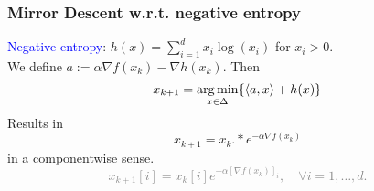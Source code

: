 \documentclass{beamer}
\begin{document}

\begin{frame}
  \frametitle{Mirror Descent w.r.t. negative entropy}
    \textcolor{blue}{Negative entropy}: $h(x) = \sum_{i=1}^{d} x_i \log(x_i)$ for $ x_i > 0$. \\
    We define $a := \alpha \nabla f(x_k) - \nabla h(x_k)$. Then
    \begin{equation}
      x_{k+1} = \operatorname*{arg\,min}_{x \in \Delta} \{ \langle a, x \rangle + h(x)\}
    \end{equation}
    Results in
    \begin{equation}
      x_{k+1} = x_k .* e^{- \alpha \nabla f(x_k)}
    \end{equation}
    in a componentwise sense.
    \textcolor{gray}{
    \begin{equation}
      x_{k+1}[i] = x_k[i] e^{- \alpha {[\nabla f(x_k)]}_i}, \quad \forall i = 1, \dots, d.
    \end{equation}}
\end{frame}



\end{document}
